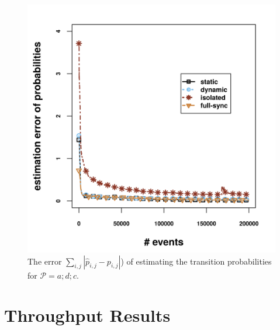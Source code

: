 \begin{figure}[H]
	\centering
	\includegraphics[width=\textwidth,keepaspectratio]{chapters/figures/synthetic/new/error_synthetic.png}
	
	\caption{The error  $\sum_{i,j} |\hat{p}_{i,j} - {p}_{i,j}|$) of estimating the transition probabilities  for $\mathcal{P}=a;d;c$.}
	\label{fig:error_synthetic}
\end{figure}




  


\section{Throughput Results}
\label{sec:throughput}

